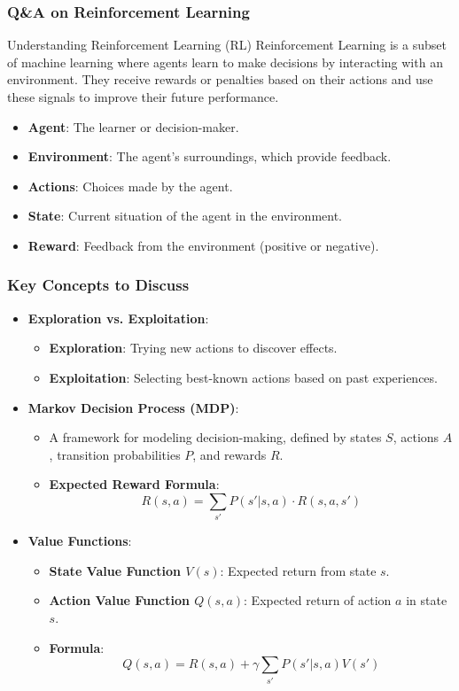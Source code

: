 \documentclass[aspectratio=169]{beamer}
\begin{document}
\begin{frame}[fragile]
    \frametitle{Q\&A on Reinforcement Learning}
    \begin{block}{Understanding Reinforcement Learning (RL)}
        Reinforcement Learning is a subset of machine learning where agents learn to make decisions by interacting with an environment. They receive rewards or penalties based on their actions and use these signals to improve their future performance.
    \end{block}
    \begin{itemize}
        \item \textbf{Agent}: The learner or decision-maker.
        \item \textbf{Environment}: The agent's surroundings, which provide feedback.
        \item \textbf{Actions}: Choices made by the agent.
        \item \textbf{State}: Current situation of the agent in the environment.
        \item \textbf{Reward}: Feedback from the environment (positive or negative).
    \end{itemize}
\end{frame}

\begin{frame}[fragile]
    \frametitle{Key Concepts to Discuss}
    \begin{itemize}
        \item \textbf{Exploration vs. Exploitation}:
        \begin{itemize}
            \item \textbf{Exploration}: Trying new actions to discover effects.
            \item \textbf{Exploitation}: Selecting best-known actions based on past experiences.
        \end{itemize}
        \item \textbf{Markov Decision Process (MDP)}:
        \begin{itemize}
            \item A framework for modeling decision-making, defined by states \( S \), actions \( A \), transition probabilities \( P \), and rewards \( R \).
            \item \textbf{Expected Reward Formula}:
            \[
            R(s, a) = \sum_{s'} P(s'|s, a) \cdot R(s, a, s')
            \]
        \end{itemize}
        \item \textbf{Value Functions}:
        \begin{itemize}
            \item \textbf{State Value Function \( V(s) \)}: Expected return from state \( s \).
            \item \textbf{Action Value Function \( Q(s, a) \)}: Expected return of action \( a \) in state \( s \).
            \item \textbf{Formula}:
            \[
            Q(s, a) = R(s, a) + \gamma \sum_{s'} P(s'|s, a) V(s')
            \]
        \end{itemize}
    \end{itemize}
\end{frame}
\end{document}
